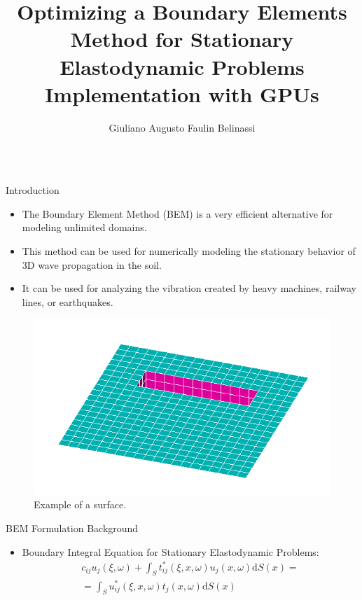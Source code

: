 \documentclass{beamer}
\author[giuliano.belinassi@usp.br]{Giuliano Augusto Faulin Belinassi}
\title{Optimizing a Boundary Elements Method for Stationary Elastodynamic Problems Implementation with GPUs}
\institute{Instituto de Matemática e Estatística - Universidade de São Paulo}
\begin{document}
\begin{frame}[fragile]\centering

\begin{columns}[T]

\begin{column}{.46\textwidth}

\begin{block}{Introduction}\justifying

\begin{itemize}

\item The Boundary Element Method (BEM) is a very efficient alternative for modeling unlimited domains.
\item This method can be used for numerically modeling the stationary behavior of 3D wave propagation in the soil.
\item It can be used for analyzing the vibration created by heavy machines, railway lines, or earthquakes.

\end{itemize}

\vspace{0.5cm}

\begin{figure}
	\centering
	\includegraphics[scale=0.7]{trincheira.png}
	\caption{Example of a surface.}

\end{figure}

\end{block}

\begin{block}{BEM Formulation Background}\justifying

\begin{itemize}
\item Boundary Integral Equation for Stationary Elastodynamic Problems:
\begin{equation}
\begin{split}
	c_{ij}u_{j}(\xi,\omega) + \int_S t_{ij}^*(\xi, x, \omega)u_j (x, \omega)\text{d}S(x) = \\
	= \int_S u_{ij}^*(\xi, x, \omega) t_j(x, \omega)\text{d}S(x) \label{bem_formulation} \nonumber
\end{split}
\end{equation}


\end{itemize}
\end{block}
\end{column}
\end{columns}
\end{frame}
\end{document}
